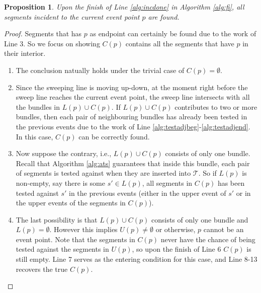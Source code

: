 \documentclass[a4paper]{article}
\newtheorem{prop}{Proposition}
\begin{document}
\begin{prop}
  Upon the finish of Line \ref{alg:incdone} in Algorithm \ref{alg:fi},
  all segments incident to the current event point $p$ are found.
  \label{prop:segfound}
\end{prop}
\begin{proof}
  Segments that has $p$ as endpoint
  can certainly be found due to the work of Line 3.
  So we focus on showing $C(p)$ contains all the segments that have $p$ in their interior.
  \begin{enumerate}
  \item The conclusion natually holds under the trivial case of $C(p) = \emptyset$.
  \item Since the sweeping line is moving up-down,
    at the moment right before the sweep line reaches the current event point,
    the sweep line intersects with all the bundles in $L(p) \cup C(p)$.
    If $L(p) \cup C(p)$ contributes to two or more bundles,
    then each pair of neighbouring bundles has already been tested in the previous events
    due to the work of Line \ref{alg:testadjbeg}-\ref{alg:testadjend}.
    In this case, $C(p)$ can be correctly found.
  \item Now suppose the contrary, i.e., $L(p) \cup C(p)$ consists of only one bundle.
    Recall that Algorithm \ref{alg:ats} guarantees that inside this bundle,
    each pair of segments is tested against when they are inserted into $\mathcal{T}$.
    So if $L(p)$ is non-empty, say there is some $s' \in L(p)$,
    all segments in $C(p)$ has been tested against $s'$ in the previous events
    (either in the upper event of $s'$ or
    in the upper events of the segments in $C(p)$).
  \item The last possibility is that
    $L(p) \cup C(p)$ consists of only one bundle and $L(p) = \emptyset$.
    However this implies $U(p) \ne \emptyset$ or otherwise, $p$ cannot be an event point.
    Note that the segments in $C(p)$ never have the chance of
    being tested against the segments in $U(p)$,
    so upon the finish of Line 6 $C(p)$ is still empty.
    Line 7 serves as the entering condition for this case,
    and Line 8-13 recovers the true $C(p)$.
  \end{enumerate}
  



\end{proof}
\end{document}
